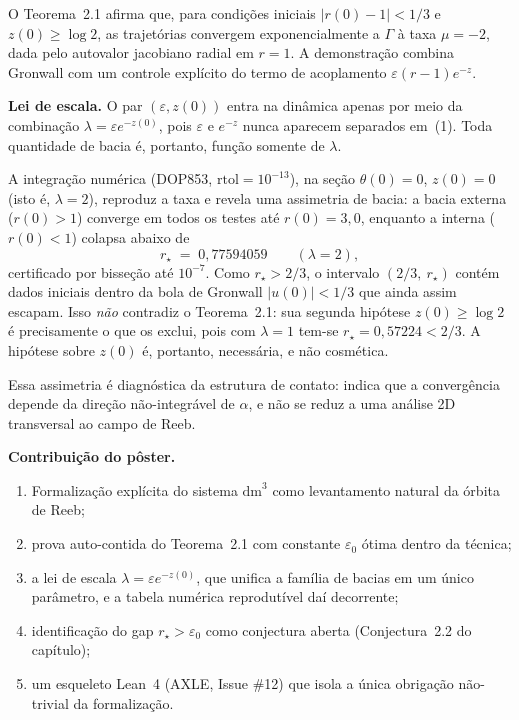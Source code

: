 \documentclass[11pt,a4paper]{article}
\theoremstyle{plain}
\newcommand{\rstar}{r_{\star}}
\begin{document}
O Teorema~2.1 afirma que, para condições iniciais $|r(0)-1| < 1/3$ e $z(0) \ge \log 2$, as
trajetórias convergem exponencialmente a $\Gamma$ à taxa $\mu = -2$, dada pelo autovalor jacobiano
radial em $r=1$. A demonstração combina Gronwall com um controle explícito do termo de acoplamento
$\varepsilon(r-1)e^{-z}$.

\medskip
\noindent\textbf{Lei de escala.} O par $(\varepsilon, z(0))$ entra na dinâmica apenas por meio da
combinação $\lambda = \varepsilon e^{-z(0)}$, pois $\varepsilon$ e $e^{-z}$ nunca aparecem separados
em~(1). Toda quantidade de bacia é, portanto, função somente de $\lambda$.

\medskip
A integração numérica (DOP853, $\mathrm{rtol}=10^{-13}$), na seção $\theta(0)=0$, $z(0)=0$
(isto é, $\lambda=2$), reproduz a taxa e revela uma assimetria de bacia: a bacia externa
($r(0)>1$) converge em todos os testes até $r(0)=3{,}0$, enquanto a interna ($r(0)<1$) colapsa abaixo
de
\[
  \rstar \;=\; 0{,}77594059 \qquad (\lambda = 2),
\]
certificado por bisseção até $10^{-7}$. Como $\rstar > 2/3$, o intervalo $(2/3,\ \rstar)$ contém
dados iniciais dentro da bola de Gronwall $|u(0)|<1/3$ que ainda assim escapam. Isso \emph{não}
contradiz o Teorema~2.1: sua segunda hipótese $z(0)\ge\log 2$ é precisamente o que os exclui, pois
com $\lambda = 1$ tem-se $\rstar = 0{,}57224 < 2/3$. A hipótese sobre $z(0)$ é, portanto, necessária,
e não cosmética.

Essa assimetria é diagnóstica da estrutura de contato: indica que a convergência depende da direção
não-integrável de $\alpha$, e não se reduz a uma análise 2D transversal ao campo de Reeb.

\medskip
\noindent\textbf{Contribuição do pôster.}
\begin{enumerate}[label=(\roman*)]
  \item Formalização explícita do sistema $\mathrm{dm}^3$ como levantamento natural da órbita de Reeb;
  \item prova auto-contida do Teorema~2.1 com constante $\varepsilon_0$ ótima dentro da técnica;
  \item a lei de escala $\lambda = \varepsilon e^{-z(0)}$, que unifica a família de bacias em um único
        parâmetro, e a tabela numérica reprodutível daí decorrente;
  \item identificação do gap $\rstar > \varepsilon_0$ como conjectura aberta (Conjectura~2.2 do capítulo);
  \item um esqueleto Lean~4 (AXLE, Issue \#12) que isola a única obrigação não-trivial da formalização.
\end{enumerate}
\end{document}
